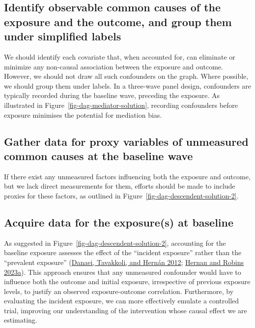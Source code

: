 \documentclass[
  singlecolumn]{report}
\begin{document}
\hypertarget{identify-observable-common-causes-of-the-exposure-and-the-outcome-and-group-them-under-simplified-labels}{%
\subsection{\texorpdfstring{\textbf{Identify observable common causes of
the exposure and the outcome, and group them under simplified
labels}}{Identify observable common causes of the exposure and the outcome, and group them under simplified labels}}\label{identify-observable-common-causes-of-the-exposure-and-the-outcome-and-group-them-under-simplified-labels}}

We should identify each covariate that, when accounted for, can
eliminate or minimize any non-causal association between the exposure
and outcome. However, we should not draw all such confounders on the
graph. Where possible, we should group them under labels. In a
three-wave panel design, confounders are typically recorded during the
baseline wave, preceding the exposure. As illustrated in
Figure~\ref{fig-dag-mediator-solution}, recording confounders before
exposure minimises the potential for mediation bias.

\hypertarget{gather-data-for-proxy-variables-of-unmeasured-common-causes-at-the-baseline-wave}{%
\subsection{\texorpdfstring{\textbf{Gather data for proxy variables of
unmeasured common causes at the baseline
wave}}{Gather data for proxy variables of unmeasured common causes at the baseline wave}}\label{gather-data-for-proxy-variables-of-unmeasured-common-causes-at-the-baseline-wave}}

If there exist any unmeasured factors influencing both the exposure and
outcome, but we lack direct measurements for them, efforts should be
made to include proxies for these factors, as outlined in
Figure~\ref{fig-dag-descendent-solution-2}.

\hypertarget{acquire-data-for-the-exposures-at-baseline}{%
\subsection{\texorpdfstring{\textbf{Acquire data for the exposure(s) at
baseline}}{Acquire data for the exposure(s) at baseline}}\label{acquire-data-for-the-exposures-at-baseline}}

As suggested in Figure~\ref{fig-dag-descendent-solution-2}, accounting
for the baseline exposure assesses the effect of the ``incident
exposure'' rather than the ``prevalent exposure''
(\protect\hyperlink{ref-danaei2012}{Danaei, Tavakkoli, and Hernán 2012};
\protect\hyperlink{ref-hernan2023}{Hernan and Robins 2023a}). This
approach ensures that any unmeasured confounder would have to influence
both the outcome and initial exposure, irrespective of previous exposure
levels, to justify an observed exposure-outcome correlation.
Furthermore, by evaluating the incident exposure, we can more
effectively emulate a controlled trial, improving our understanding of
the intervention whose causal effect we are estimating.
\end{document}
